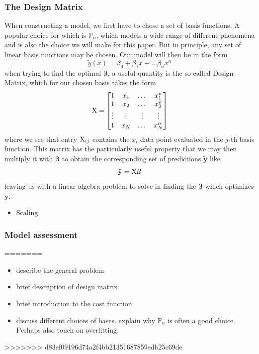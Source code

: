 \documentclass[reprint, english, nofootinbib]{revtex4-2}
\begin{document}
        \subsubsection{The Design Matrix}
            \noindent
            When constructing a model, we first have to chose a set of basis functions. A popular choice for which is $\mathbb P_n$, which models a wide range of different phenomena and is also the choice we will make for this paper. But in principle, any set of linear basis functions may be chosen.
            Our model will then be in the form
            \begin{equation}
                \tilde y (x) = \beta_0 + \beta_1 x + \dots \beta_n x^n
            \end{equation}
            when trying to find the optimal $\pmb \beta$, a useful quantity is the so-called Design Matrix, which for our chosen basis takes the form
            \begin{equation}
                \textup{X} = \qty[
                \begin{matrix}
                    1 & x_1 & \dots & x_1^n \\
                    1 & x_2 & \dots & x_2^n \\
                    \vdots & \vdots & \vdots & \vdots \\
                    1 & x_N & \dots & x_N^n
                \end{matrix}
                ]
            \end{equation}
            where we see that entry $\textup{X}_{ij}$ contains the $x_i$ data point evaluated in the $j$-th basis function. This matrix has the particularly useful property that we may then multiply it with $\pmb \beta$ to obtain the corresponding set of predictions $\mathbf{\tilde y}$ like
            \begin{equation}
                \mathbf{\tilde y} = \textup{X}\pmb \beta
            \end{equation}
            leaving us with a linear algebra problem to solve in finding the $\pmb\beta$ which optimizes $\mathbf{\tilde y}$.

            \begin{itemize}
                \item Scaling
            \end{itemize}

        \subsubsection{Model assessment}
=======
        \begin{itemize}
            \item describe the general problem
            \item brief description of design matrix
            \item brief introduction to the cost function
            \item discuss different choices of bases. explain why $\mathbb P_n$ is often a good choice. Perhaps also touch on overfitting.
        \end{itemize}
>>>>>>> d83ef09196d74a2f4bb21351687859edb25c69de
\end{document}

